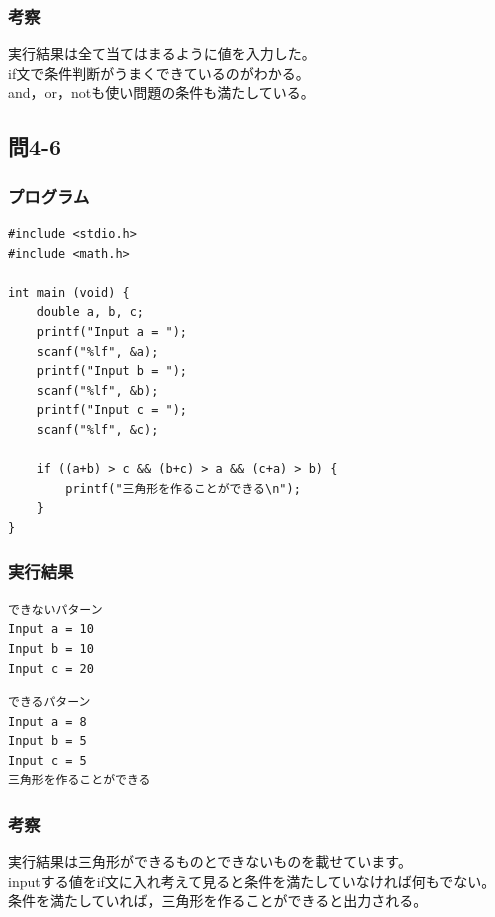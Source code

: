 \documentclass{jarticle}
\begin{document}
\subsubsection{考察\\}
実行結果は全て当てはまるように値を入力した。\\
if文で条件判断がうまくできているのがわかる。\\
and，or，notも使い問題の条件も満たしている。\\

\subsection{問4-6\\}
\subsubsection{プログラム\\}
\begin{breakbox}
\begin{verbatim}
#include <stdio.h>
#include <math.h>

int main (void) { 
    double a, b, c;
    printf("Input a = ");
    scanf("%lf", &a);
    printf("Input b = ");
    scanf("%lf", &b);
    printf("Input c = ");
    scanf("%lf", &c);

    if ((a+b) > c && (b+c) > a && (c+a) > b) {
        printf("三角形を作ることができる\n");
    }
}
\end{verbatim}
\end{breakbox}
\subsubsection{実行結果\\}
\begin{breakbox}
\begin{verbatim}
できないパターン
Input a = 10
Input b = 10
Input c = 20
\end{verbatim}
\end{breakbox}
\begin{breakbox}
\begin{verbatim}
できるパターン
Input a = 8       
Input b = 5
Input c = 5
三角形を作ることができる
\end{verbatim}
\end{breakbox}
\subsubsection{考察\\}
実行結果は三角形ができるものとできないものを載せています。\\
inputする値をif文に入れ考えて見ると条件を満たしていなければ何もでない。\\
条件を満たしていれば，三角形を作ることができると出力される。\\
\end{document}
